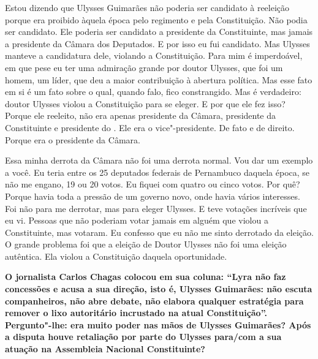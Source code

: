 Estou dizendo que Ulysses Guimarães não poderia ser candidato à
reeleição porque era proibido àquela época pelo regimento e pela
Constituição. Não podia ser candidato. Ele poderia ser candidato a
presidente da Constituinte, mas jamais a presidente da Câmara dos
Deputados. E por isso eu fui candidato. Mas Ulysses manteve a
candidatura dele, violando a Constituição. Para mim é imperdoável, em
que pese eu ter uma admiração grande por doutor Ulysses, que foi um
homem, um líder, que deu a maior contribuição à abertura política. Mas
esse fato em si é um fato sobre o qual, quando falo, fico constrangido.
Mas é verdadeiro: doutor Ulysses violou a Constituição para se eleger. E
por que ele fez isso? Porque ele reeleito, não era apenas presidente da
Câmara, presidente da Constituinte e presidente do . Ele era o
vice"-presidente. De fato e de direito. Porque era o presidente da
Câmara.

Essa minha derrota da Câmara não foi uma derrota normal. Vou dar um
exemplo a você. Eu teria entre os 25 deputados federais de Pernambuco
daquela época, se não me engano, 19 ou 20 votos. Eu fiquei com quatro ou
cinco votos. Por quê? Porque havia toda a pressão de um governo novo,
onde havia vários interesses. Foi não para me derrotar, mas para eleger
Ulysses. E teve votações incríveis que eu vi. Pessoas que não poderiam
votar jamais em alguém que violou a Constituinte, mas votaram. Eu
confesso que eu não me sinto derrotado da eleição. O grande problema foi
que a eleição de Doutor Ulysses não foi uma eleição autêntica. Ela
violou a Constituição daquela oportunidade.

\textbf{O jornalista Carlos Chagas colocou em sua coluna: ``Lyra não faz
concessões e acusa a sua direção, isto é, Ulysses Guimarães: não escuta
companheiros, não abre debate, não elabora qualquer estratégia para
remover o lixo autoritário incrustado na atual Constituição''.
Pergunto"-lhe: era muito poder nas mãos de Ulysses Guimarães? Após a
disputa houve retaliação por parte do Ulysses para/com a sua atuação na
Assembleia Nacional Constituinte?}

